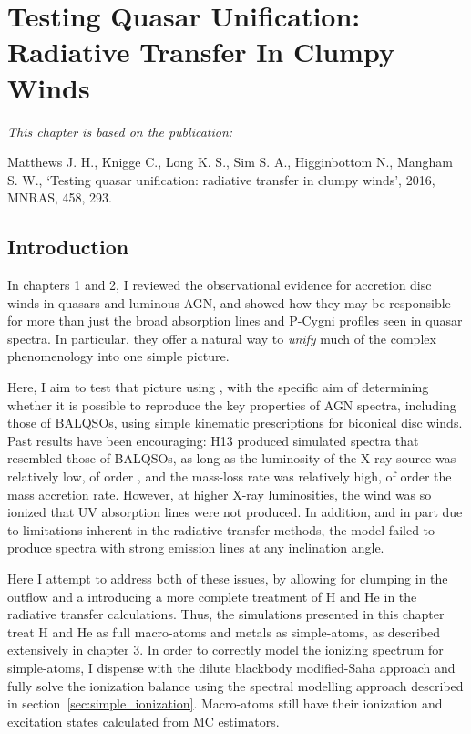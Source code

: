 \chapter{Testing Quasar Unification: Radiative Transfer In Clumpy Winds}

{\em This chapter is based on the publication:

Matthews J. H., Knigge C., Long K. S., Sim S. A., Higginbottom N., Mangham S. W., 
`Testing quasar unification: radiative transfer in clumpy winds',
2016, MNRAS, 458, 293.}


%
%

\section{Introduction}

In chapters 1 and 2, I reviewed the observational evidence for accretion disc
winds in quasars and luminous AGN, and showed how they may be responsible
for more than just the broad absorption lines and P-Cygni profiles
seen in quasar spectra. In particular, they offer a natural way to
{\em unify} much of the complex phenomenology into one simple picture.

Here, I aim to test that picture using \py, with
the specific aim of determining whether it is possible to 
reproduce the key properties of AGN spectra, including those of BALQSOs, 
using simple kinematic prescriptions for biconical disc winds. 
Past results have been encouraging: H13
produced simulated spectra that resembled those of BALQSOs, as long as 
the luminosity of the X-ray source was relatively low, of order 
, and the mass-loss rate was relatively high, of order the 
mass accretion rate.  However, at higher X-ray luminosities, the wind was
so ionized that UV absorption lines were not produced.  In addition, and 
in part due to limitations inherent in 
the radiative transfer methods, the model failed 
to produce spectra with strong emission lines at any inclination angle.

Here I attempt to address both of these issues, by
allowing for clumping in the outflow and a introducing a more complete
treatment of H and He in the radiative transfer calculations.
Thus, the simulations presented in this chapter treat H and He as full
macro-atoms and metals as simple-atoms, as described extensively
in chapter 3. In order to correctly model the ionizing spectrum for simple-atoms,
I dispense with the dilute blackbody modified-Saha approach and fully solve the ionization
balance using the spectral modelling approach described 
in section~\ref{sec:simple_ionization}. Macro-atoms still have their
ionization and excitation states calculated from MC estimators.

